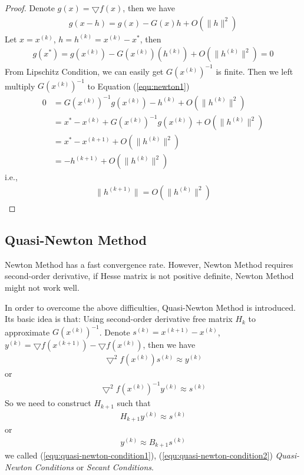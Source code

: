 \begin{proof}
    Denote $g(x) = \bigtriangledown f(x)$, then we have
    \begin{align}
        g(x - h) = g(x) - G(x)h + O(\parallel h \parallel^2)
    \end{align}
    Let $x = x^{(k)}$, $h = h^{(k)} = x^{(k)} - x^*$, then
    \begin{align}
        g(x^*) = g(x^{(k)}) - G(x^{(k)})(h^{(k)})
        + O(\parallel h^{(k)} \parallel^2) = 0
        \label{equ:newton1}
    \end{align}
    From Lipschitz Condition, we can easily get 
    $G(x^{(k)})^{-1}$ is finite. Then we left multiply
    $G(x^{(k)})^{-1}$ to Equation (\ref{equ:newton1})
    \begin{align}
        0 &= G(x^{(k)})^{-1} g(x^{(k)}) - h^{(k)}
         + O(\parallel h^{(k)} \parallel^2) \\
        &= x^* - x^{(k)} + G(x^{(k)})^{-1} g(x^{(k)})
         + O(\parallel h^{(k)} \parallel^2) \\
         &= x^* - x^{(k+1)}
         + O(\parallel h^{(k)} \parallel^2) \\
         &= - h^{(k+1)} + O(\parallel h^{(k)} \parallel^2)
    \end{align}
    i.e.,
    \begin{align}
        \parallel h^{(k+1)} \parallel = O(\parallel h^{(k)} \parallel^2)
    \end{align}
\end{proof}

\subsection{Quasi-Newton Method}
Newton Method has a fast convergence rate.
However, Newton Method requires second-order derivative,
if Hesse matrix is not positive definite, Newton Method
might not work well.
\par
In order to overcome the above difficulties,
Quasi-Newton Method is introduced.
Its basic idea is that:
Using second-order derivative free matrix $H_k$
to approximate $G(x^{(k)})^{-1}$.
Denote $s^{(k)} = x^{(k+1)} - x^{(k)}$,
$y^{(k)} = \bigtriangledown f(x^{(k+1)}) - \bigtriangledown f(x^{(k)})$,
then we have
\begin{align}
    \bigtriangledown^2 f(x^{(k)}) s^{(k)} \approx y^{(k)}
\end{align}
or
\begin{align}
    \bigtriangledown^2 f(x^{(k)})^{-1} y^{(k)} \approx s^{(k)}
\end{align}
So we need to construct $H_{k+1}$ such that
\begin{align}
    H_{k+1} y^{(k)} \approx s^{(k)}
    \label{equ:quasi-newton-condition1}
\end{align}
or
\begin{align}
    y^{(k)} \approx B_{k+1} s^{(k)}
    \label{equ:quasi-newton-condition2}
\end{align}
we called (\ref{equ:quasi-newton-condition1}), (\ref{equ:quasi-newton-condition2})
\textit{Quasi-Newton Conditions}
or \textit{Secant Conditions}.

